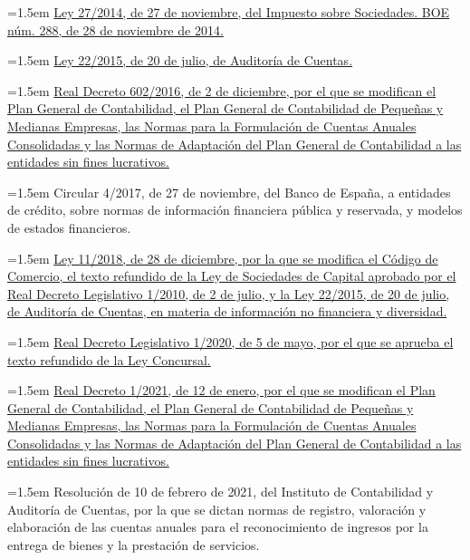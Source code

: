 \documentclass[10pt,a4paper]{article}
\begin{document}
\noindent\hangindent=1.5em \href{https://www.boe.es/eli/es/l/2014/11/27/27/con}{Ley 27/2014, de 27 de noviembre, del Impuesto sobre Sociedades. BOE núm. 288, de 28 de noviembre de 2014.}

\noindent\hangindent=1.5em \href{https://www.boe.es/eli/es/l/2015/07/20/22/con}{Ley 22/2015, de 20 de julio, de Auditoría de Cuentas.}

\noindent\hangindent=1.5em \href{https://www.boe.es/eli/es/rd/2016/12/02/602}{Real Decreto 602/2016, de 2 de diciembre, por el que se modifican el Plan General de Contabilidad, el Plan General de Contabilidad de Pequeñas y Medianas Empresas, las Normas para la Formulación de Cuentas Anuales Consolidadas y las Normas de Adaptación del Plan General de Contabilidad a las entidades sin fines lucrativos.}

\noindent\hangindent=1.5em Circular 4/2017, de 27 de noviembre, del Banco de España, a entidades de crédito, sobre normas de información financiera pública y reservada, y modelos de estados financieros.

\noindent\hangindent=1.5em \href{https://www.boe.es/eli/es/l/2018/12/28/11}{Ley 11/2018, de 28 de diciembre, por la que se modifica el Código de Comercio, el texto refundido de la Ley de Sociedades de Capital aprobado por el Real Decreto Legislativo 1/2010, de 2 de julio, y la Ley 22/2015, de 20 de julio, de Auditoría de Cuentas, en materia de información no financiera y diversidad.}

\noindent\hangindent=1.5em \href{https://www.boe.es/eli/es/rdlg/2020/05/05/1/con}{Real Decreto Legislativo 1/2020, de 5 de mayo, por el que se aprueba el texto refundido de la Ley Concursal.}

\noindent\hangindent=1.5em \href{https://www.boe.es/eli/es/rd/2021/01/12/1}{Real Decreto 1/2021, de 12 de enero, por el que se modifican el Plan General de Contabilidad, el Plan General de Contabilidad de Pequeñas y Medianas Empresas, las Normas para la Formulación de Cuentas Anuales Consolidadas y las Normas de Adaptación del Plan General de Contabilidad a las entidades sin fines lucrativos.}

\noindent\hangindent=1.5em Resolución de 10 de febrero de 2021, del Instituto de Contabilidad y Auditoría de Cuentas, por la que se dictan normas de registro, valoración y elaboración de las cuentas anuales para el reconocimiento de ingresos por la entrega de bienes y la prestación de servicios.
\end{document}
